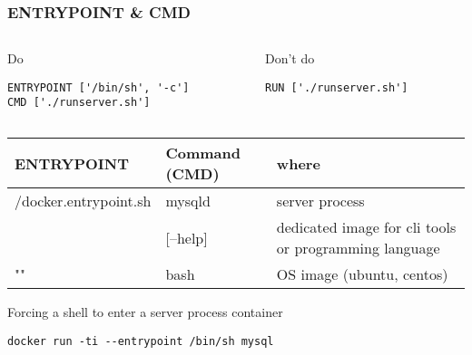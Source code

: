 \documentclass{beamer}
\begin{document}
\begin{frame}[fragile]
    \frametitle{ENTRYPOINT \& CMD}

    \begin{columns}
    \begin{column}{0.48\textwidth}
        \begin{exampleblock}{Do}
        \begin{verbatim}
ENTRYPOINT ['/bin/sh', '-c']
CMD ['./runserver.sh']
        \end{verbatim}
        \end{exampleblock}
    \end{column}
    \begin{column}{0.48\textwidth}
        \begin{alertblock}{Don't do}
        \begin{verbatim}
RUN ['./runserver.sh']
        \end{verbatim}
        \end{alertblock}
    \end{column}
    \end{columns}

    \begin{table}
    \begin{tabular}{|l|l|p{4.5cm}|} \hline \rowcolor{lightgray}
ENTRYPOINT                          & Command (CMD)      & where                          \\ \hline
/docker.entrypoint.sh               & mysqld             & server process                 \\ \hline
['helm']                            & [--help]           & dedicated image for cli tools \newline
                                                           or programming language        \\ \hline
""                                  & bash               & OS image (ubuntu, centos)      \\ \hline
    \end{tabular}
    \end{table}

    \begin{block}{Forcing a shell to enter a server process container}
        \begin{verbatim}
docker run -ti --entrypoint /bin/sh mysql
        \end{verbatim}
    \end{block}

\end{frame}
\end{document}

